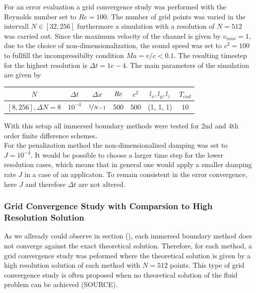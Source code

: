 For an error evaluation a grid convergence study was performed with the Reynolds number set to $Re=100$.
The number of grid points was varied in the intervall $N\in[32, 256]$ furthermore a
simulation with a resolution of $N=512$ was carried out.
Since the maximum velocity of the channel is given by $v_{max}=1$, due to the choice of non-dimensionalization,
the sound speed was set to $c^2 = 100$ to fullfill the incompressibilty condition $Ma = v/c < 0.1$.
The resulting timestep for the highest resolution is $\Delta t = 1e-4$.
The main parameters of the simulation are  given by

\begin{center}
\vspace*{0.7ex}
\begin{tabular}{c|c|c|c|c|c|c }
 $ N  $                   & $\Delta t$ & $\Delta x$            & $\mbox{\textit{Re}}$  & $c^2$   & $l_x, l_y, l_z$ & $T_{end}$\\
\hline
 $[8, 256], \Delta N = 8 $& $10^{-4}$ & $\nicefrac{1}{N - 1}$ & 500     & $500$   & (1, 1, 1)       & 10\\
\end{tabular}
\vspace*{0.7ex}
\end{center}

With this setup all immersed boundary methods were tested for 2nd and 4th order finite difference schemes.\\
For the penalization method the non-dimensionalized damping was set to $J=10^{-4}$.
It would be possible to choose a larger time step for the lower resolution cases, which means that in general
one would apply a smaller damping rate $J$ in a case of an applicaton. To remain consistent in the error convergence, here $J$ and
therefore $\Delta t$ are not altered.


\subsubsection{Grid Convergence Study with Comparsion to High Resolution Solution}

As we allready could observe in section (), each immersed boundary method does not converge against the exact theoretical solution.
Therefore, for each method, a grid convergence study was peformed where the theoretical solution is given by a
high resolution solution of each method with $N=512$ points. This type of grid convergence study is often proposed
when no theoretical solution of the fluid problem can be achieved (SOURCE).

